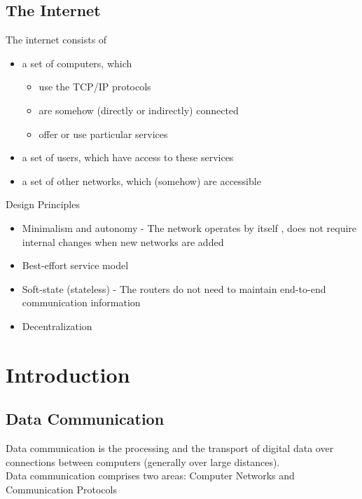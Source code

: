 \documentclass[11pt,ngerman]{article}
\begin{document}
\subsection{The Internet}
The internet consists of
\begin{itemize}[noitemsep,nolistsep]
	\item a	set	of	computers,	which
	\begin{itemize}[noitemsep,nolistsep]
		\item use	the	TCP/IP	protocols
		\item are	somehow	(directly	or	indirectly)	connected
		\item offer	or	use	particular	services
	\end{itemize}
	\item a	set	of	users,	which	have	access	to	these	services
	\item a	set	of	other	networks,	which	(somehow)	are	accessible\\
\end{itemize}

\noindent Design Principles
\begin{itemize}[noitemsep,nolistsep]
	\item Minimalism	and	autonomy  - The	network	operates	by	itself	, does	not	require	internal	changes	when	new	networks	are	added
	\item Best-effort	service	model
	\item Soft-state	(stateless) - The	routers	do	not need	to	maintain end-to-end	communication	
information
	\item Decentralization
\end{itemize}






\section{Introduction}
\subsection{Data	Communication}
Data	communication	is	the	processing	and	the	transport	of	digital	data	over	
connections	between	computers	(generally	over	large	distances).\\
Data	communication	comprises	two areas: Computer	Networks and Communication	Protocols
\end{document}
